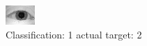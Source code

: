 \begin{figure}[h!]
\begin{center}
\includegraphics[width=0.60\columnwidth]{figures/ID936_class_1_target_2.png}
\end{center}
\caption{ Classification: 1 actual target: 2}
\label{fig:ID936_class_1_target_2}
\end{figure}
